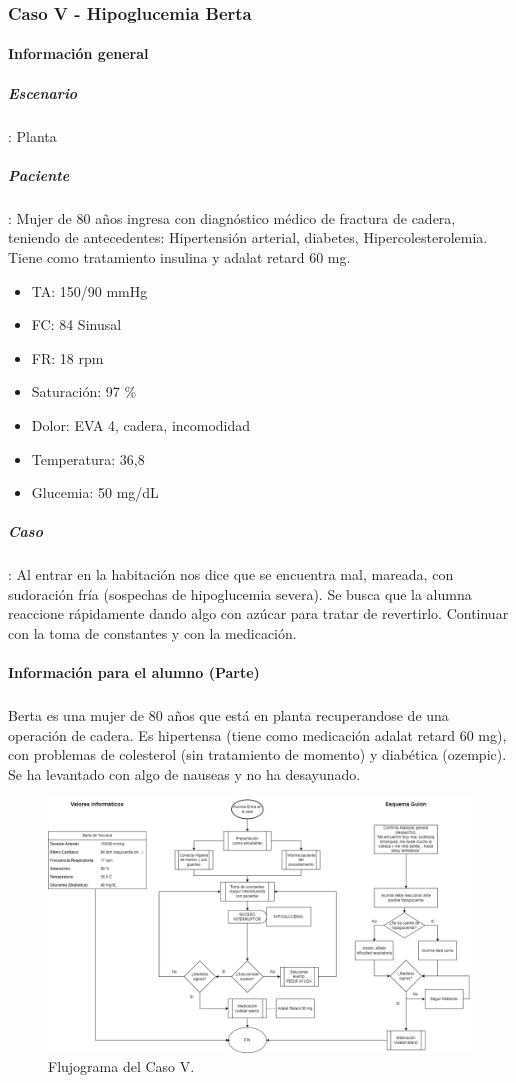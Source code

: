 \subsubsection{Caso V - Hipoglucemia Berta}
\begin{multicols}{2}
    \paragraph{Información general}
    \subparagraph{Escenario}: Planta
    \subparagraph{Paciente}: Mujer de 80 años ingresa con diagnóstico médico de fractura de cadera, teniendo de antecedentes: Hipertensión arterial, diabetes, Hipercolesterolemia. Tiene como tratamiento insulina y adalat retard 60 mg.
    \begin{itemize}[topsep=0pt, partopsep=0pt,itemsep=0pt,parsep=0pt]
        \item TA: 150/90 mmHg
        \item FC: 84 Sinusal
        \item FR: 18 rpm
        \item Saturación: 97 \%
        \item Dolor: EVA 4, cadera, incomodidad
        \item Temperatura: 36,8
        \item Glucemia: 50 mg/dL
    \end{itemize}
    \subparagraph{Caso}: Al entrar en la habitación nos dice que se encuentra mal, mareada, con sudoración fría (sospechas de hipoglucemia severa). Se busca que la alumna reaccione rápidamente dando algo con azúcar para tratar de revertirlo. Continuar con la toma de constantes y con la medicación.
    \columnbreak
    \paragraph{Información para el alumno (Parte)}
    \subparagraph{} Berta es una mujer de 80 años que está en planta recuperandose de una operación de cadera. Es hipertensa (tiene como medicación adalat retard 60 mg), con problemas de colesterol (sin tratamiento de momento) y diabética (ozempic). Se ha levantado con algo de nauseas y no ha desayunado.
\end{multicols}
\begin{figure}[H]
    \centering
	\includegraphics[width=\textwidth]{./imagenes/ACV-AdSC-CasoVDiagramaFlujoIIEnf.png}
	\caption{\label{fig:PlanXVII:CasoV}Flujograma del Caso V.}
\end{figure}



